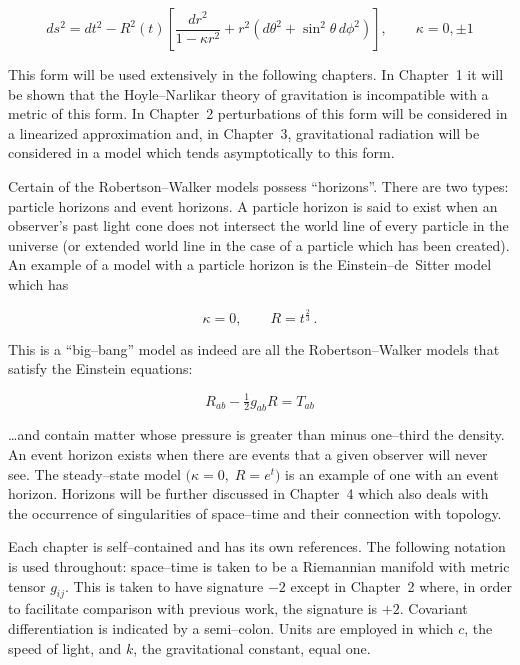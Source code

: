 \[
ds^{2} = dt^{2} - R^{2}(t) \left[ \frac{dr^{2}}{1 - \kappa r^{2}} + r^{2} \left( d\theta^{2} + \sin^{2}\theta \, d\phi^{2} \right) \right],
\qquad \kappa = 0, \pm 1
\]

This form will be used extensively in the following chapters. 
In Chapter~1 it will be shown that the Hoyle--Narlikar theory 
of gravitation is incompatible with a metric of this form. 
In Chapter~2 perturbations of this form will be considered in 
a linearized approximation and, in Chapter~3, gravitational 
radiation will be considered in a model which tends asymptotically 
to this form.

Certain of the Robertson--Walker models possess ``horizons''. 
There are two types: particle horizons and event horizons. 
A particle horizon is said to exist when an observer's past 
light cone does not intersect the world line of every particle 
in the universe (or extended world line in the case of a 
particle which has been created). An example of a model with 
a particle horizon is the Einstein--de~Sitter model which has 

\[
\kappa = 0, \qquad R = t^{\tfrac{2}{3}} \, .
\]


This is a ``big--bang'' model as indeed are all the Robertson--Walker models that satisfy the Einstein equations:

\[
R_{ab} - \tfrac{1}{2} g_{ab} R = T_{ab}
\]

\noindent
\ldots and contain matter whose pressure is greater than minus one--third the density. 
An event horizon exists when there are events that a given observer will never see. 
The steady--state model $\bigl(\kappa = 0, \; R = e^{t}\bigr)$ is an example of one with an event horizon. 
Horizons will be further discussed in Chapter~4 which also deals with the occurrence of singularities of space--time and their connection with topology.

\medskip

Each chapter is self--contained and has its own references. 
The following notation is used throughout: space--time is taken to be a Riemannian manifold with metric tensor $g_{ij}$. 
This is taken to have signature $-2$ except in Chapter~2 where, in order to facilitate comparison with previous work, the signature is $+2$. 
Covariant differentiation is indicated by a semi--colon. 
Units are employed in which $c$, the speed of light, and $k$, the gravitational constant, equal one.
